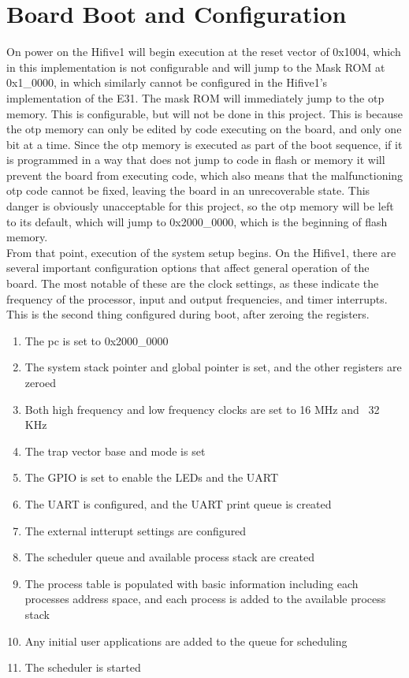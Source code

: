 \section{Board Boot and Configuration}
On power on the Hifive1 will begin execution at the reset vector of 0x1004, which in this implementation is not configurable and will jump to the Mask ROM at 0x1\_0000, in which similarly cannot be configured in the Hifive1's implementation of the E31. The mask ROM will immediately jump to the \ac{otp} memory. This is configurable, but will not be done in this project. This is because the \ac{otp} memory can only be edited by code executing on the board, and only one bit at a time. Since the \ac{otp} memory is executed as part of the boot sequence, if it is programmed in a way that does not jump to code in flash or memory it will prevent the board from executing code, which also means that the malfunctioning \ac{otp} code cannot be fixed, leaving the board in an unrecoverable state. This danger is obviously unacceptable for this project, so the \ac{otp} memory will be left to its default, which will jump to 0x2000\_0000, which is the beginning of flash memory.\\
From that point, execution of the system setup begins.
On the Hifive1, there are several important configuration options that affect general operation of the board. The most notable of these are the clock settings, as these indicate the frequency of the processor, input and output frequencies, and timer interrupts. This is the second thing configured during boot, after zeroing the registers.
\begin{enumerate}
    \item The pc is set to 0x2000\_0000
    \item The system stack pointer and global pointer is set, and the other registers are zeroed
    \item Both high frequency and low frequency clocks are set to 16 MHz and ~32 KHz
    \item The trap vector base and mode is set
    \item The GPIO is set to enable the LEDs and the UART
    \item The UART is configured, and the UART print queue is created
    \item The external intterupt settings are configured
    \item The scheduler queue and available process stack are created
    \item The process table is populated with basic information including each processes address space, and each process is added to the available process stack
    \item Any initial user applications are added to the queue for scheduling
    \item The scheduler is started
\end{enumerate}

